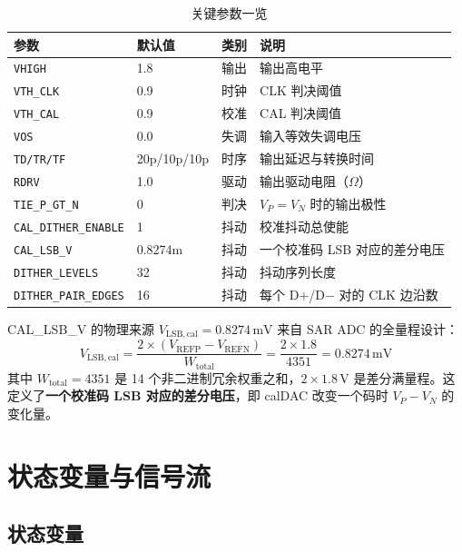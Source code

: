 \documentclass[UTF8,a4paper,11pt]{ctexart}
\newcommand{\Vlsb}{V_{\mathrm{LSB,cal}}}
\newcommand{\code}[1]{\texttt{#1}}
\begin{document}
\begin{table}[H]
\centering
\caption{关键参数一览}
\label{tab:params}
\small
\begin{tabularx}{\textwidth}{l l l X}
\toprule
参数 & 默认值 & 类别 & 说明 \\
\midrule
\code{VHIGH} & 1.8 & 输出 & 输出高电平 \\
\code{VTH\_CLK} & 0.9 & 时钟 & CLK 判决阈值 \\
\code{VTH\_CAL} & 0.9 & 校准 & CAL 判决阈值 \\
\code{VOS} & 0.0 & 失调 & 输入等效失调电压 \\
\code{TD/TR/TF} & 20p/10p/10p & 时序 & 输出延迟与转换时间 \\
\code{RDRV} & 1.0 & 驱动 & 输出驱动电阻（$\Omega$） \\
\code{TIE\_P\_GT\_N} & 0 & 判决 & $V_P = V_N$ 时的输出极性 \\
\code{CAL\_DITHER\_ENABLE} & 1 & 抖动 & 校准抖动总使能 \\
\code{CAL\_LSB\_V} & 0.8274m & 抖动 & 一个校准码 LSB 对应的差分电压 \\
\code{DITHER\_LEVELS} & 32 & 抖动 & 抖动序列长度 \\
\code{DITHER\_PAIR\_EDGES} & 16 & 抖动 & 每个 D+/D$-$ 对的 CLK 边沿数 \\
\bottomrule
\end{tabularx}
\end{table}

\begin{keybox}{CAL\_LSB\_V 的物理来源}
$\Vlsb = 0.8274\,\mathrm{mV}$ 来自 SAR ADC 的全量程设计：
\begin{equation}
\Vlsb = \frac{2 \times (V_{\mathrm{REFP}} - V_{\mathrm{REFN}})}{W_{\mathrm{total}}} = \frac{2 \times 1.8}{4351} = 0.8274\,\mathrm{mV}
\end{equation}
其中 $W_{\mathrm{total}} = 4351$ 是 14 个非二进制冗余权重之和，$2 \times 1.8\,\mathrm{V}$ 是差分满量程。这定义了\textbf{一个校准码 LSB 对应的差分电压}，即 calDAC 改变一个码时 $V_P - V_N$ 的变化量。
\end{keybox}

\section{状态变量与信号流}

\subsection{状态变量}
\end{document}
